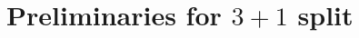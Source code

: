 \documentclass[
10pt, %
a4paper, %
oneside, %
headinclude,footinclude, %
BCOR5mm, %
]{scrartcl}
\newcommand{\pd}[1]{\partial_{#1}}
\newcommand{\tetrsymbol}{h}
\newcommand{\tetr}[2]{\tetrsymbol^{#1}_{\phantom{#1}#2}}
\newcommand{\Laghodge}{L}%
\newcommand{\EM}[2]{\Sigma^{#1}_{\phantom{#1}#2}}
\newcommand{\EMmat}[2]{\sigma^{#1}_{\ \,#2}}
\newcommand{\EMgrav}[2]{t^{#1}_{\phantom{#1}#2}}
\newcommand{\HDT}[1]{\accentset{\star}{T}^{#1}}
\newcommand{\Tscal}{\mathcal{T}}		%
\begin{document}
%



\section{Preliminaries for $ 3+1 $ split}\label{sec.31.prep}
\end{document}
